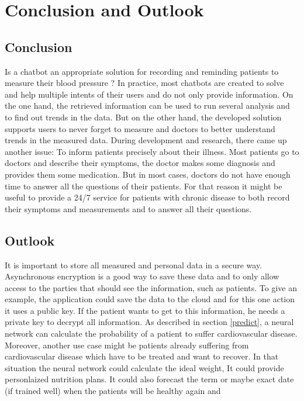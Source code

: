 \chapter{Conclusion and Outlook }
\section{Conclusion}

Is a chatbot an appropriate solution for recording and reminding patients to measure their blood pressure ? 
In practice, most chatbots are created to solve and help multiple intents of their users and do not only provide information.
On the one hand, the retrieved information can be used to run several analysis and to find out trends in the data. But on the other hand, the developed solution  supports users to never forget to measure and doctors to better understand trends in the measured data.
During development and research, there came up another issue: To inform patients precisely about their illness. Most patients go to doctors and describe their symptoms, the doctor makes some diagnosis and provides them some medication. But in most cases, doctors do not have enough time to answer all the questions of their patients. For that reason it might be useful to provide a 24/7 service for patients with chronic disease to both record their symptoms and measurements and to answer all their questions.

\section{Outlook}

It is important to store all measured and personal data in a secure way. Asynchronous encryption is a good way to save these data and to only allow access to the parties that should see the information, such as patients. To give an example, the application could save the data to the cloud and for this one action it uses a public key. If the patient wants to get to this information, he needs a private key to decrypt all information. 
As described in section \ref{predict}, a neural network can calculate the probability of a patient to suffer cardiovascular disease.
Moreover, another use case might be patients already suffering from cardiovascular disease which have to be treated and want to recover. In that situation the neural network could calculate the ideal weight,
It could provide personlaized nutrition plans. It could also forecast the term or maybe exact date (if trained well) when the patients will be healthy again and  

